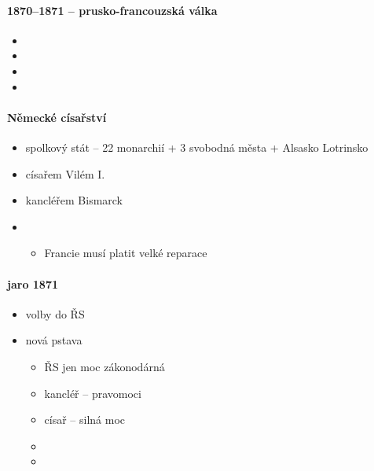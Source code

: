 \paragraph{1870--1871 -- prusko-francouzská válka}
\begin{itemize}
\item {}
\item {}
\item {}
\item {}
\end{itemize}

\paragraph{Německé císařství}
\begin{itemize}
\item spolkový stát -- 22 monarchií + 3 svobodná města + Alsasko Lotrinsko
\item císařem Vilém I.
\item kancléřem Bismarck
\item {}
	\begin{itemize}
	\item Francie musí platit velké reparace
	\end{itemize}
\end{itemize}

\paragraph{jaro 1871}
\begin{itemize}
\item volby do ŘS
\item nová pstava
	\begin{itemize}
	\item ŘS jen moc zákonodárná
	\item kancléř -- pravomoci
	\item císař -- silná moc
	\item 
	\item
	\end{itemize}
\end{itemize}

